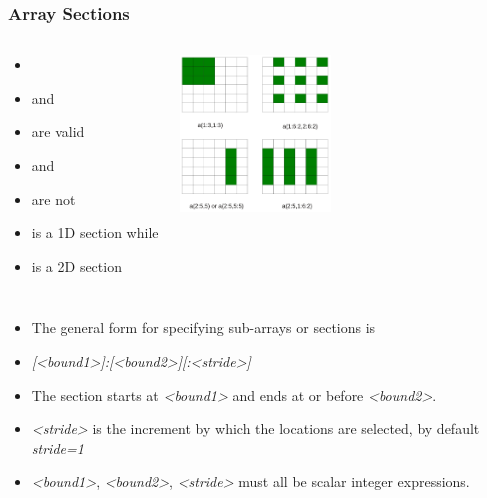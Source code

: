\documentclass[10pt,t]{beamer}
\begin{document}
\begin{frame}
  \frametitle{\small Array Sections}
  \begin{columns}[t]
    \column{7cm}
    \begin{itemize}
      \scriptsize
      \item[] 
      \item {} and
      \item[] {} are valid
      \item {} and
      \item[] {} are not
      \item {} is a 1D section while 
      \item[] {} is a 2D section
    \end{itemize}
    \column{4cm}
    \begin{center}
      \includegraphics[width=4cm,clip=true]{./graphics/array6}
    \end{center}
  \end{columns}
  \begin{itemize}
    \scriptsize
    \item The general form for specifying sub-arrays or sections is
    \item[] \textit{[<bound1>]:[<bound2>][:<stride>]}
    \item The section starts at \textit{<bound1>} and ends at or before \textit{<bound2>}.
    \item \textit{<stride>} is the increment by which the locations are selected, by default \textit{stride=1}
    \item \textit{<bound1>}, \textit{<bound2>}, \textit{<stride>} must all be scalar integer expressions.
  \end{itemize}


\end{frame}
\end{document}

